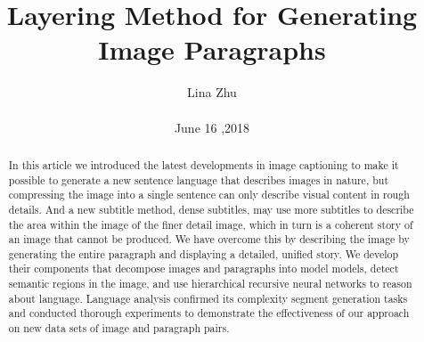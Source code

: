 \documentclass[10pt,twocolumn,letterpaper]{article}
\begin{document}
	\title{Layering Method for Generating Image Paragraphs}
	\author{Lina Zhu\\\\June 16 ,2018}

\maketitle
\begin{abstract}
	In this article we introduced the latest developments in image captioning to make it possible to generate a new sentence language that describes images in nature, but compressing the image into a single sentence can only describe visual content in rough details. And a new subtitle method, dense subtitles, may use more subtitles to describe the area within the image of the finer detail image, which in turn is a coherent story of an image that cannot be produced. We have overcome this by describing the image by generating the entire paragraph and displaying a detailed, unified story. We develop their components that decompose images and paragraphs into model models, detect semantic regions in the image, and use hierarchical recursive neural networks to reason about language. Language analysis confirmed its complexity segment generation tasks and conducted thorough experiments to demonstrate the effectiveness of our approach on new data sets of image and paragraph pairs.
\end{abstract}
\end{document}
